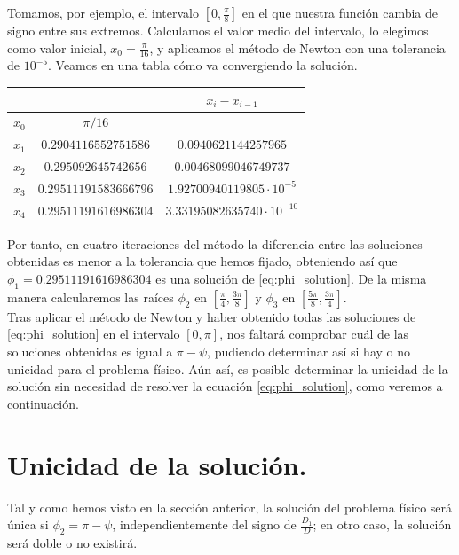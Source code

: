 \documentclass[11pt]{book}
\begin{document}
Tomamos, por ejemplo, el intervalo $[0,\frac{\pi}{8}]$ en el que nuestra función cambia de signo entre sus extremos. Calculamos el valor medio del intervalo, lo elegimos como valor inicial, $x_0=\frac{\pi}{16}$, y aplicamos el método de Newton con una tolerancia de $10^{-5}$. Veamos en una tabla cómo va convergiendo la solución.
\begin{table}[H]
\centering
\def\arraystretch{1.5}
\setlength{\tabcolsep}{20pt}
\begin{tabular}{cc|c}
      &                       & $x_i-x_{i-1}$                   \\ \hline
$x_0$ & $\pi/16$              &                                 \\ \hline
$x_1$ & $0.2904116552751586$  & $0.0940621144257965$            \\ \hline
$x_2$ & $0.295092645742656$   & $0.00468099046749737$           \\ \hline
$x_3$ & $0.29511191583666796$ & $1.92700940119805\cdot10^{-5}$  \\ \hline
$x_4$ & $0.29511191616986304$ & $3.33195082635740\cdot10^{-10}$ \\ \hline
\end{tabular}
\end{table}

Por tanto, en cuatro iteraciones del método la diferencia entre las soluciones obtenidas es menor a la tolerancia que hemos fijado, obteniendo así que $\phi_1=0.29511191616986304$ es una solución de \eqref{eq:phi_solution}. De la misma manera calcularemos las raíces $\phi_2$ en $[\frac{\pi}{4},\frac{3\pi}{8}]$ y $\phi_3$ en $[\frac{5\pi}{8},\frac{3\pi}{4}]$.\\

Tras aplicar el método de Newton y haber obtenido todas las soluciones de \eqref{eq:phi_solution} en el intervalo $[0,\pi]$, nos faltará comprobar cuál de las soluciones obtenidas es igual a $\pi-\psi$, pudiendo determinar así si hay o no unicidad para el problema físico. Aún así, es posible determinar la unicidad de la solución sin necesidad de resolver la ecuación \eqref{eq:phi_solution}, como veremos a continuación.\\

\section{Unicidad de la solución.}
\label{sec:unicidad}
Tal y como hemos visto en la sección anterior, la solución del problema físico será única si $\phi_2=\pi-\psi$, independientemente del signo de $\frac{D_1}{D}$; en otro caso, la solución será doble o no existirá.\\
\end{document}
